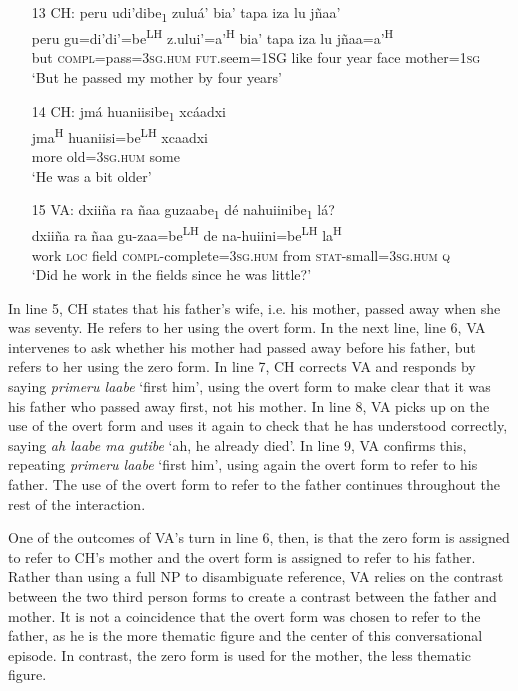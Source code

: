 \begin{itemize}
\item[13 CH:] 
\glll peru udi'dibe\textsubscript{1} zulu\'{a}' bia' tapa iza lu j\~{n}aa'  \\
peru gu=di'di'=be\textsuperscript{LH}  z.ului'=a'\textsuperscript{H} bia' tapa iza	lu j\~{n}aa=a'\textsuperscript{H}  \\
but \textsc{compl}=pass=\textsc{3sg.hum} \textsc{fut}.seem=1SG like four year face mother=\textsc{1sg}  \\
\glt `But he passed my mother by four years'


\item[14 CH:]
\glll jm\'{a} huaniisibe\textsubscript{1} xc\'{a}adxi  \\
jma\textsuperscript{H}	huaniisi=be\textsuperscript{LH}  xcaadxi  \\
more old=\textsc{3sg.hum} some  \\
\glt `He was a bit older'


\item[15 VA:]
dxii\~{n}a ra \~{n}aa guzaabe\textsubscript{1} d\'{e} nahuiinibe\textsubscript{1} l\'{a}?  \\
dxii\~{n}a ra \~{n}aa gu-zaa=be\textsuperscript{LH} de na-huiini=be\textsuperscript{LH} la\textsuperscript{H} \\
work \textsc{loc} field \textsc{compl}-complete=\textsc{3sg.hum} from \textsc{stat}-small=\textsc{3sg.hum} \textsc{q} \\
\glt `Did he work in the fields since he was little?'

\end{itemize}
\z

In line 5, CH states that his father's wife, i.e. his mother, passed away when she was seventy. He refers to her using the overt form. In the next line, line 6, VA intervenes to ask whether his mother had passed away before his father, but refers to her using the zero form. In line 7, CH corrects VA and responds by saying \textit{primeru laabe} `first him', using the overt form to make clear that it was his father who passed away first, not his mother. In line 8, VA picks up on the use of the overt form and uses it again to check that he has understood correctly, saying \textit{ah laabe ma gutibe} `ah, he already died'. In line 9, VA confirms this, repeating \textit{primeru laabe} `first him', using again the overt form to refer to his father. The use of the overt form to refer to the father continues throughout the rest of the interaction.

One of the outcomes of VA's turn in line 6, then, is that the zero form is assigned to refer to CH's mother and the overt form is assigned to refer to his father. Rather than using a full NP to disambiguate reference, VA relies on the contrast between the two third person forms to create a contrast between the father and mother. It is not a coincidence that the overt form was chosen to refer to the father, as he is the more thematic figure and the center of this conversational episode. In contrast, the zero form is used for the mother, the less thematic figure.

